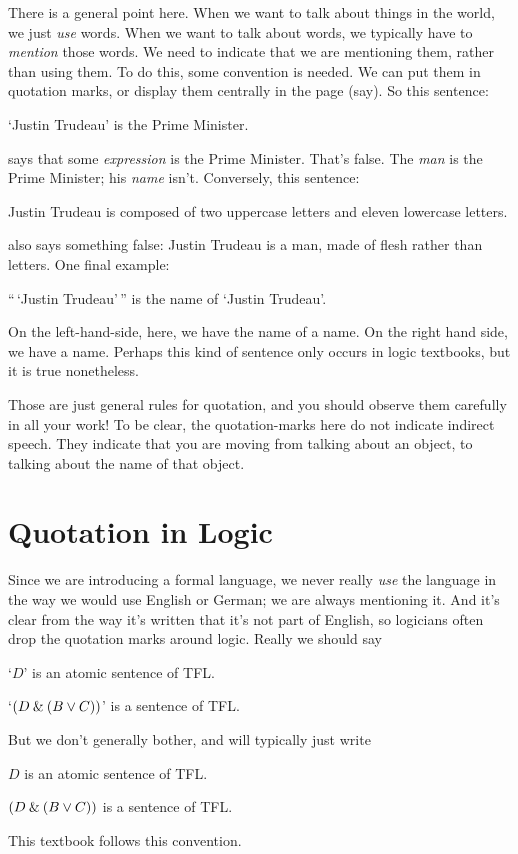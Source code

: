 There is a general point here. When we want to talk about things in the world, we just \emph{use} words. When we want to talk about words, we typically have to \emph{mention} those words. We need to indicate that we are mentioning them, rather than using them. To do this, some convention is needed. We can put them in quotation marks, or display them centrally in the page (say). So this sentence:
	\begin{ebullet}
		\item `Justin Trudeau' is the Prime Minister.
	\end{ebullet}
says that some \emph{expression} is the Prime Minister. That's false. The \emph{man} is the Prime Minister; his \emph{name} isn't. Conversely, this sentence:
	\begin{ebullet}
		\item Justin Trudeau is composed of two uppercase letters and eleven lowercase letters.
	\end{ebullet}
also says something false: Justin Trudeau is a man, made of flesh rather than letters. One final example:
	\begin{ebullet}
		\item ``\,`Justin Trudeau'\,'' is the name of `Justin Trudeau'.
	\end{ebullet} 
On the left-hand-side, here, we have the name of a name. On the right hand side, we have a name. Perhaps this kind of sentence only occurs in logic textbooks, but it is true nonetheless. 

Those are just general rules for quotation, and you should observe them carefully in all your work! To be clear, the quotation-marks here do not indicate indirect speech. They indicate that you are moving from talking about an object, to talking about the name of that object.

\section{Quotation in Logic}
Since we are introducing a formal language, we never really \emph{use} the language in the way we would use English or German; we are always mentioning it. And it's clear from the way it's written that it's not part of English, so logicians often drop the quotation marks around logic. Really we should say 
	\begin{ebullet}
		\item `$D$' is an atomic sentence of TFL.
			\item `$(D\mathbin{\&}(B\vee C))$' is a sentence of TFL.
	\end{ebullet} But we don't generally bother, and will typically just write 	\begin{ebullet}
			\item $D$ is an atomic sentence of TFL.
				\item $(D\mathbin{\&}(B\vee C))$ is a sentence of TFL.
			\end{ebullet}
This textbook follows this convention.

